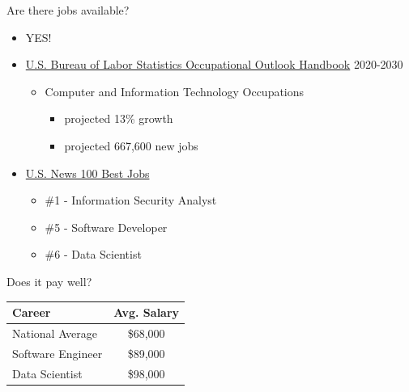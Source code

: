\documentclass[aspectratio=169]{beamer}
\begin{document}
\begin{frame}{Are there jobs available?}
    \begin{itemize}[label=--]
        \item YES!
        \item \href{https://www.bls.gov/ooh/computer-and-information-technology/home.htm}{U.S. Bureau of Labor Statistics Occupational Outlook Handbook} 2020-2030
            \begin{itemize}[label=\(\blacktriangleright\)]
                \item Computer and Information Technology Occupations
                \begin{itemize}[label=--,itemsep=5pt]
                    \item projected 13\% growth
                    \item projected 667,600 new jobs
                \end{itemize}
            \end{itemize}
        \item \href{https://money.usnews.com/careers/best-jobs/rankings/the-100-best-jobs}{U.S. News 100 Best Jobs}
            \begin{itemize}[label=\(\blacktriangleright\),itemsep=5pt]
                \item \#1 - Information Security Analyst
                \item \#5 - Software Developer
                \item \#6 - Data Scientist
            \end{itemize}
    \end{itemize}
\end{frame}
\begin{frame}{Does it pay well?}
    \begin{table}
    \centering
        \begin{tabular}{lc}
            \toprule
            \textbf{Career}    & \textbf{Avg. Salary} \\
            \midrule
            National Average   & \$68,000             \\
            \midrule
            Software Engineer  & \$89,000             \\
            Data Scientist     & \$98,000             \\
            \bottomrule
        \end{tabular}
    \end{table}   
\end{frame}
\end{document}
